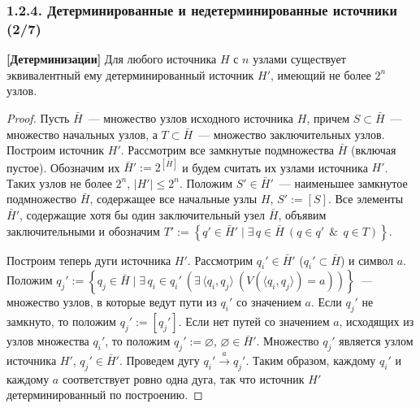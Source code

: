 \documentclass[mathserif,12pt,aspectratio=169]{beamer}
\def\NB#1{{\bf\color{brown}#1}}
\let\emptyset\varnothing
\def\Set#1#2{\left\{ #1 \mid #2 \right\}}
\def\Assign{\operatorname{:=}}
\def\E#1#2{\exists\,#1\ \left(#2\right)}
\def\And{\operatorname{\,\&\,}}
\let\leq\leqslant
\begin{document}
\begin{frame}[shrink=22]
\frametitle{1.2.4. Детерминированные и недетерминированные источники (2/7)}

\begin{theorem} {\NB{[Детерминизации]}}
Для любого  источника $H$ с $n$ узлами существует эквивалентный
ему детерминированный источник $H'$, имеющий не более $2^n$ узлов.
\end{theorem}
\begin{proof}
Пусть $\bar{H}$~--- множество узлов исходного источника $H$,
причем $S\subset\bar{H}$~--- множество начальных узлов,
а $T\subset\bar{H}$~--- множество заключительных узлов.
Построим источник $H'$. Рассмотрим все замкнутые подмножества
$\bar{H}$ (включая пустое). Обозначим их $\bar{H}'\Assign 2^{[\bar{H}]}$
и будем считать их узлами источника $H'$.  Таких узлов не более
$2^n$, $|H'|\leq 2^n$. Положим $S'\in \bar{H}'$~--- наименьшее замкнутое подмножество
$\bar{H}$, содержащее все начальные узлы $H$,
$S'\Assign[S]$. Все элементы $\bar{H}'$,
содержащие хотя бы один заключительный узел $\bar{H}$, объявим
заключительными и обозначим 
$T'\Assign\Set{q'\in\bar{H}'}{\E{q\in\bar{H}}{q\in q'\And q\in T}}$.

Построим теперь дуги источника $H'$. Рассмотрим $q_i'\in \bar{H}'$
($q_i'\subset \bar{H}$) и символ $a$.
Положим $q_j'\Assign \Set{q_j\in \bar{H}}{
\E{q_i\in q_i'}{\E{ \langle q_i, q_j\rangle}{ V(\langle q_i,
q_j\rangle)=a}}}$~--- множество узлов, в которые ведут пути из
$q_i'$ со значением $a$. Если $q_j'$ не замкнуто, то положим
$q_j'\Assign [q_j']$. Если нет путей со значением $a$, исходящих из
узлов множества $q_i'$,  то положим $q_j'\Assign \emptyset$, $\emptyset\in \bar{H}'$.
Множество $q_j'$ является узлом источника $H'$, $q_j'\in\bar{H}'$.
Проведем дугу $q_i'\stackrel{a}\longrightarrow q_j'$.
Таким
образом, каждому $q_i'$ и каждому $a$ соответствует ровно одна
дуга, так что источник $H'$ детерминированный по построению.
\end{proof}
\end{frame}
\end{document}
